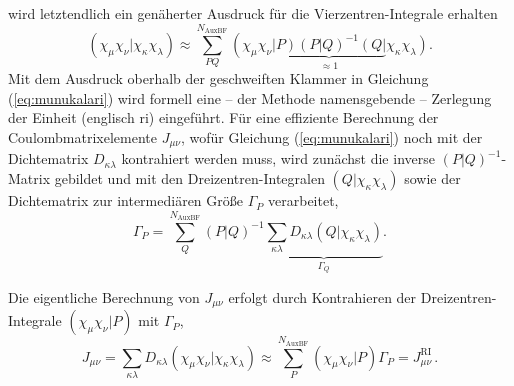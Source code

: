 	wird letztendlich ein genäherter Ausdruck für die Vierzentren-Integrale erhalten	
	\begin{equation}\label{eq:munukalari}
	\left(\chi_\mu\chi_\nu\vert\chi_\kappa\chi_\lambda\right)\approx\sum_{PQ}^{N_{\textrm{AuxBF}}}\left(\chi_\mu\chi_\nu\right.\underbrace{\left.\vert P\right)\left(P\vert Q\right)^{-1}\left(Q\vert\right.}_{\approx 1}\left.\chi_\kappa\chi_\lambda\right).		
	\end{equation}
	Mit dem Ausdruck oberhalb der geschweiften Klammer in Gleichung (\ref{eq:munukalari}) wird formell eine -- der Methode namensgebende -- Zerlegung der Einheit (englisch \acf{ri}) eingeführt.
	Für eine effiziente Berechnung der Coulombmatrixelemente $J_{\mu\nu}$, wofür Gleichung (\ref{eq:munukalari}) noch mit der Dichtematrix $D_{\kappa\lambda}$ kontrahiert werden muss, wird zunächst die inverse $\left(P\vert Q\right)^{-1}$-Matrix gebildet und mit den Dreizentren-Integralen $\left(Q\vert\chi_\kappa\chi_\lambda\right)$ sowie der Dichtematrix zur intermediären Größe $\Gamma_P$ verarbeitet,
	\begin{equation}
	\Gamma_P=\sum_Q^{N_{\textrm{AuxBF}}}\left(P\vert Q\right)^{-1}\underbrace{\sum_{\kappa\lambda}D_{\kappa\lambda}\left(Q\vert\chi_\kappa\chi_\lambda\right)}_{\Gamma_Q}.
	\end{equation}
	
	Die eigentliche Berechnung von $J_{\mu\nu}$ erfolgt durch Kontrahieren der Dreizentren-Integrale $\left(\chi_\mu\chi_\nu\vert P\right)$ mit $\Gamma_P$,
	\begin{equation}
	J_{\mu\nu}=\sum_{\kappa\lambda}D_{\kappa\lambda}\left(\chi_\mu\chi_\nu\vert\chi_\kappa\chi_\lambda\right)\approx\sum_{P}^{N_{\textrm{AuxBF}}}\left(\chi_\mu\chi_\nu\vert P\right)\Gamma_P=J_{\mu\nu}^{\textrm{RI}}\, .
	\end{equation}
	
